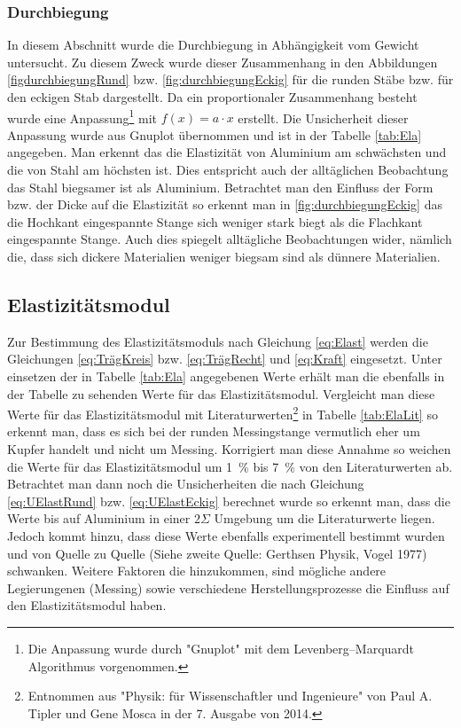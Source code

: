 \subsubsection*{Durchbiegung}
In diesem Abschnitt wurde die Durchbiegung in Abhängigkeit vom Gewicht untersucht. Zu diesem Zweck wurde dieser Zusammenhang in den Abbildungen \ref{figdurchbiegungRund} bzw. \ref{fig:durchbiegungEckig}  für die runden Stäbe bzw. für den eckigen Stab dargestellt. Da ein proportionaler Zusammenhang besteht wurde eine Anpassung\footnote{Die Anpassung wurde durch "Gnuplot" mit dem Levenberg–Marquardt Algorithmus vorgenommen.  }  mit $f(x)=a \cdot x$ erstellt. Die Unsicherheit dieser Anpassung wurde aus Gnuplot übernommen und ist in der Tabelle \ref{tab:Ela} angegeben.
Man erkennt das die Elastizität von Aluminium am schwächsten und die von Stahl am höchsten ist. Dies entspricht auch der alltäglichen Beobachtung das Stahl biegsamer ist als Aluminium.
Betrachtet man den Einfluss der Form bzw. der Dicke auf die Elastizität so erkennt man in \ref{fig:durchbiegungEckig} das die Hochkant eingespannte Stange sich weniger stark biegt als die Flachkant eingespannte Stange. Auch dies spiegelt alltägliche Beobachtungen wider, nämlich die, dass sich dickere Materialien weniger biegsam sind als dünnere Materialien.

\subsection{Elastizitätsmodul}


Zur Bestimmung des Elastizitätsmoduls nach Gleichung \ref{eq:Elast} werden die Gleichungen \ref{eq:TrägKreis} bzw. \ref{eq:TrägRecht} und \ref{eq:Kraft} eingesetzt. Unter einsetzen der in Tabelle \ref{tab:Ela} angegebenen Werte erhält man die ebenfalls in der Tabelle zu sehenden Werte für das Elastizitätsmodul.
Vergleicht man diese Werte für das Elastizitätsmodul mit Literaturwerten\footnote{Entnommen aus "Physik: für Wissenschaftler und Ingenieure" von Paul A. Tipler und Gene Mosca in der 7. Ausgabe von 2014.} in Tabelle \ref{tab:ElaLit} so erkennt man, dass es sich bei der runden Messingstange vermutlich eher um Kupfer handelt und nicht um Messing. Korrigiert man diese Annahme so weichen die Werte für das Elastizitätsmodul um \SI{1}{\percent} bis \SI{7}{\percent} von den Literaturwerten ab. Betrachtet man dann noch die Unsicherheiten die nach Gleichung \ref{eq:UElastRund} bzw. \ref{eq:UElastEckig} berechnet wurde so erkennt man, dass die Werte bis auf Aluminium in einer $2\Sigma$ Umgebung um die Literaturwerte liegen. Jedoch kommt hinzu, dass diese Werte ebenfalls experimentell bestimmt wurden und von Quelle zu Quelle (Siehe zweite Quelle: Gerthsen Physik, Vogel 1977) schwanken. Weitere Faktoren die hinzukommen, sind mögliche andere Legierungenen (Messing) sowie verschiedene Herstellungsprozesse die Einfluss auf den Elastizitätsmodul haben. 


